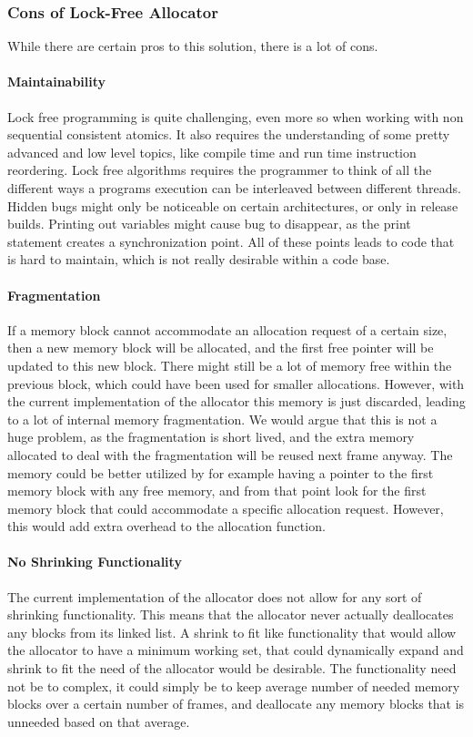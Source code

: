 \subsubsection{Cons of Lock-Free Allocator}
While there are certain pros to this solution, there is a lot of cons.

\paragraph{Maintainability}
Lock free programming is quite challenging, even more so when working with non sequential consistent atomics.
It also requires the understanding of some pretty advanced and low level topics, like compile time and run time instruction reordering.
Lock free algorithms requires the programmer to think of all the different ways a programs execution can be interleaved between different threads.
Hidden bugs might only be noticeable on certain architectures, or only in release builds.
Printing out variables might cause bug to disappear, as the print statement creates a synchronization point.
All of these points leads to code that is hard to maintain, which is not really desirable within a code base.

\paragraph{Fragmentation}
If a memory block cannot accommodate an allocation request of a certain size, then a new memory block will be allocated,
and the first free pointer will be updated to this new block.
There might still be a lot of memory free within the previous block, which could have been used for smaller allocations.
However, with the current implementation of the allocator this memory is just discarded, leading to a lot of internal memory fragmentation.
We would argue that this is not a huge problem, as the fragmentation is short lived, and the extra memory allocated to deal with the fragmentation
will be reused next frame anyway.
The memory could be better utilized by for example having a pointer to the first memory block with any free memory, and from that point look for
the first memory block that could accommodate a specific allocation request. However, this would add extra overhead to the allocation function.

\paragraph{No Shrinking Functionality}
The current implementation of the allocator does not allow for any sort of shrinking functionality.
This means that the allocator never actually deallocates any blocks from its linked list.
A shrink to fit like functionality that would allow the allocator to have a minimum working set,
that could dynamically expand and shrink to fit the need of the allocator would be desirable.
The functionality need not be to complex, it could simply be to keep average number of needed memory blocks
over a certain number of frames, and deallocate any memory blocks that is unneeded based on that average.

